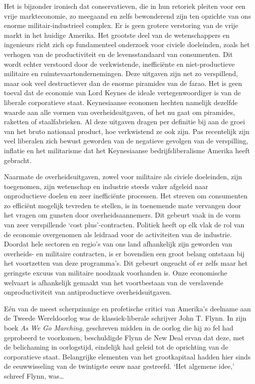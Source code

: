 \documentclass[
  a5paper,
  smalldemyvopaper,10pt,twoside,onecolumn,openright,extrafontsizes,hidelinks]{memoir}
\begin{document}
Het is bijzonder ironisch dat conservatieven, die in hun retoriek
pleiten voor een vrije markteconomie, zo meegaand en zelfs bewonderend
zijn ten opzichte van ons enorme militair-industrieel complex. Er is
geen grotere verstoring van de vrije markt in het huidige Amerika. Het
grootste deel van de wetenschappers en ingenieurs richt zich op
fundamenteel onderzoek voor civiele doeleinden, zoals het verhogen van
de productiviteit en de levensstandaard van consumenten. Dit wordt
echter verstoord door de verkwistende, inefficiënte en niet-productieve
militaire en ruimtevaartondernemingen. Deze uitgaven zijn net zo
verspillend, maar ook veel destructiever dan de enorme piramides van de
farao. Het is geen toeval dat de economie van Lord Keynes de ideale
vertegenwoordiger is van de liberale corporatieve staat. Keynesiaanse
economen hechten namelijk dezelfde waarde aan alle vormen van
overheidsuitgaven, of het nu gaat om piramides, raketten of
staalfabrieken. Al deze uitgaven dragen per definitie bij aan de groei
van het bruto nationaal product, hoe verkwistend ze ook zijn. Pas
recentelijk zijn veel liberalen zich bewust geworden van de negatieve
gevolgen van de verspilling, inflatie en het militarisme dat het
Keynesiaanse bedrijfsliberalisme Amerika heeft gebracht.

Naarmate de overheidsuitgaven, zowel voor militaire als civiele
doeleinden, zijn toegenomen, zijn wetenschap en industrie steeds vaker
afgeleid naar onproductieve doelen en zeer inefficiënte processen. Het
streven om consumenten zo efficiënt mogelijk tevreden te stellen, is in
toenemende mate vervangen door het vragen om gunsten door
overheidsaannemers. Dit gebeurt vaak in de vorm van zeer verspillende
`cost plus'-contracten. Politiek heeft op elk vlak de rol van de
economie overgenomen als leidraad voor de activiteiten van de industrie.
Doordat hele sectoren en regio's van ons land afhankelijk zijn geworden
van overheids- en militaire contracten, is er bovendien een groot belang
ontstaan bij het voortzetten van deze programma's. Dit gebeurt ongeacht
of er zelfs maar het geringste excuus van militaire noodzaak voorhanden
is. Onze economische welvaart is afhankelijk gemaakt van het
voortbestaan van de verslavende onproductiviteit van antiproductieve
overheidsuitgaven.

Eén van de meest scherpzinnige en profetische critici van Amerika's
deelname aan de Tweede Wereldoorlog was de klassiek-liberale schrijver
John T. Flynn. In zijn boek \emph{As We Go Marching}, geschreven midden
in de oorlog die hij zo fel had geprobeerd te voorkomen, beschuldigde
Flynn de New Deal ervan dat deze, met de belichaming in oorlogstijd,
eindelijk had geleid tot de oprichting van de corporatieve staat.
Belangrijke elementen van het grootkapitaal hadden hier sinds de
eeuwwisseling van de twintigste eeuw naar gestreefd. `Het algemene
idee,' schreef Flynn, was\ldots{}
\end{document}
